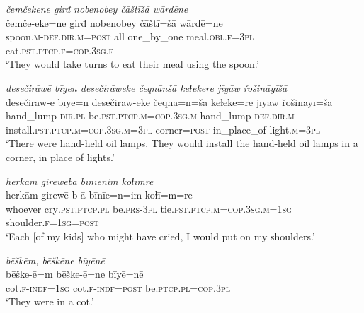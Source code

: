\ea \label{ŽE.29}
\textit{čemčekene girđ nobenobey čāštīšā wārdēne} \\ 
\gll čemče-eke=ne girđ nobenobey čāštī=šā wārdē=ne \\ 
 spoon\textsc{.m}\textsc{-def}\textsc{.dir}\textsc{.m}\textsc{=\textsc{post}} all one\_by\_one meal\textsc{.obl}\textsc{.f}\textsc{=3pl} eat\textsc{.pst}\textsc{.ptcp}\textsc{.f}\textsc{=cop}\textsc{.3sg}\textsc{.f} \\ 
\glt `They would take turns to eat their meal using the spoon.'
\z 
 
\ea \label{ŽE.41}
\textit{desečirāwē bīyen desečirāweke čeqnānšā keɫekere jīyāw řošināyīšā} \\ 
\gll desečirāw-ē bīye=n desečirāw-eke čeqnā=n=šā keɫeke=re jīyāw řošināyī=šā \\ 
 hand\_lump\textsc{-dir}\textsc{.pl} be\textsc{.pst}\textsc{.ptcp}\textsc{.m}\textsc{=cop}\textsc{.3sg}\textsc{.m} hand\_lump\textsc{-def}\textsc{.dir}\textsc{.m} install\textsc{.pst}\textsc{.ptcp}\textsc{.m}\textsc{=cop}\textsc{.3sg}\textsc{.m}\textsc{=3pl} corner\textsc{=\textsc{post}} in\_place\_of light\textsc{.m}\textsc{=3pl} \\ 
\glt `There were hand-held oil lamps. They would install the hand-held oil lamps in a corner, in place of lights.'
\z 
 
\ea \label{ŽE.64}
\textit{herkām girewēbā bīnīenim koɫīmre} \\ 
\gll herkām girewē b-ā bīnīe=n=im koɫī=m=re \\ 
 whoever cry\textsc{.pst}\textsc{.ptcp}\textsc{.pl} be\textsc{.prs}\textsc{-3pl} tie\textsc{.pst}\textsc{.ptcp}\textsc{.m}\textsc{=cop}\textsc{.3sg}\textsc{.m}\textsc{=\textsc{1sg}} shoulder\textsc{.f}\textsc{=\textsc{1sg}}\textsc{=\textsc{post}} \\ 
\glt `Each [of my kids] who might have cried, I would put on my shoulders.'
\z 
 
\ea \label{ŽE.65}
\textit{bēškēm, bēškēne bīyēnē} \\ 
\gll bēške-ē=m bēške-ē=ne bīyē=nē \\ 
 cot\textsc{.f}\textsc{-indf}\textsc{=\textsc{1sg}} cot\textsc{.f}\textsc{-indf}\textsc{=\textsc{post}} be\textsc{.ptcp}\textsc{.pl}\textsc{=cop}\textsc{.3pl} \\ 
\glt `They were in a cot.'
\z 
 
